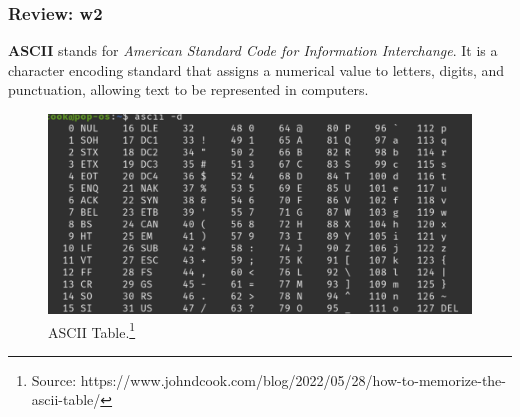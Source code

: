\documentclass[
	11pt, %
]{beamer}
\begin{document}
\begin{frame}
	\frametitle{Review: w2}

	\textbf{ASCII} stands for \textit{American Standard Code for Information Interchange}. It is a character encoding standard that assigns a numerical value to letters, digits, and punctuation, allowing text to be represented in computers.

 
	\begin{figure}
		\includegraphics[width=0.7\linewidth]{ascii.png}
  		\caption{ASCII Table.\footnote{Source: https://www.johndcook.com/blog/2022/05/28/how-to-memorize-the-ascii-table/}}
	\end{figure}



\end{frame}

\end{document}
